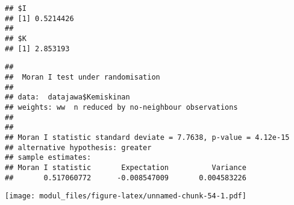 \documentclass[
]{book}
\newenvironment{Shaded}{\begin{snugshade}}{\end{snugshade}}
\newcommand{\AttributeTok}[1]{\textcolor[rgb]{0.77,0.63,0.00}{#1}}
\newcommand{\FunctionTok}[1]{\textcolor[rgb]{0.00,0.00,0.00}{#1}}
\newcommand{\NormalTok}[1]{#1}
\newcommand{\OtherTok}[1]{\textcolor[rgb]{0.56,0.35,0.01}{#1}}
\newcommand{\SpecialCharTok}[1]{\textcolor[rgb]{0.00,0.00,0.00}{#1}}
\newcommand{\StringTok}[1]{\textcolor[rgb]{0.31,0.60,0.02}{#1}}
\begin{document}
\begin{Shaded}
\end{Shaded}

\begin{verbatim}
## $I
## [1] 0.5214426
## 
## $K
## [1] 2.853193
\end{verbatim}

\begin{Shaded}
\end{Shaded}

\begin{verbatim}
## 
##  Moran I test under randomisation
## 
## data:  datajawa$Kemiskinan  
## weights: ww  n reduced by no-neighbour observations
##   
## 
## Moran I statistic standard deviate = 7.7638, p-value = 4.12e-15
## alternative hypothesis: greater
## sample estimates:
## Moran I statistic       Expectation          Variance 
##       0.517060772      -0.008547009       0.004583226
\end{verbatim}

\begin{Shaded}
\end{Shaded}

\texttt{[image: modul\_files/figure-latex/unnamed-chunk-54-1.pdf]}
\end{document}
